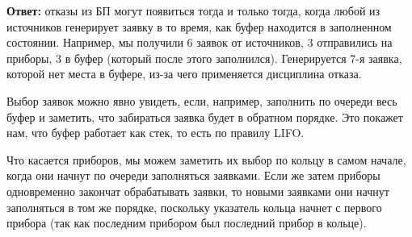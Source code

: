 \documentclass[a4paper, 14pt]{article}
\begin{document}
\begin{enumerate}
	      \textbf{Ответ:} отказы из БП могут появиться тогда и только тогда, когда любой из источников генерирует заявку в то время, как буфер находится в заполненном состоянии. Например, мы получили 6 заявок от источников, 3 отправились на приборы, 3 в буфер (который после этого заполнился). Генерируется 7-я заявка, которой нет места в буфере, из-за чего применяется дисциплина отказа.

	      Выбор заявок можно явно увидеть, если, например, заполнить по очереди весь буфер и заметить, что забираться заявка будет в обратном порядке. Это покажет нам, что буфер работает как стек, то есть по правилу LIFO.

	      Что касается приборов, мы можем заметить их выбор по кольцу в самом начале, когда они начнут по очереди заполняться заявками. Если же затем приборы одновременно закончат обрабатывать заявки, то новыми заявками они начнут заполняться в том же порядке, поскольку указатель кольца начнет с первого прибора (так как последним прибором был последний прибор в кольце).
\end{enumerate}
\end{document}
